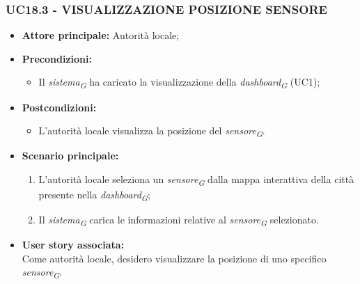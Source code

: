 \subsubsection{UC18.3 - VISUALIZZAZIONE POSIZIONE SENSORE}
\begin{itemize}
    \item \textbf{Attore principale:} Autorità locale;
    \item \textbf{Precondizioni:}
        \begin{itemize}
            \item Il \textit{sistema}\textsubscript{\textit{G}} ha caricato la visualizzazione della \textit{dashboard}\textsubscript{\textit{G}} (UC1);
        \end{itemize}
    \item \textbf{Postcondizioni:}
        \begin{itemize}
            \item L'autorità locale visualizza la posizione del \textit{sensore}\textsubscript{\textit{G}}.
        \end{itemize}
    \item \textbf{Scenario principale:}
        \begin{enumerate}
            \item L'autorità locale seleziona un \textit{sensore}\textsubscript{\textit{G}} dalla mappa interattiva della città presente nella \textit{dashboard}\textsubscript{\textit{G}};
            \item Il \textit{sistema}\textsubscript{\textit{G}} carica le informazioni relative al \textit{sensore}\textsubscript{\textit{G}} selezionato.
        \end{enumerate}
    \item \textbf{User story associata:} \\
        Come autorità locale, desidero visualizzare la posizione di uno specifico \textit{sensore}\textsubscript{\textit{G}}.
\end{itemize}